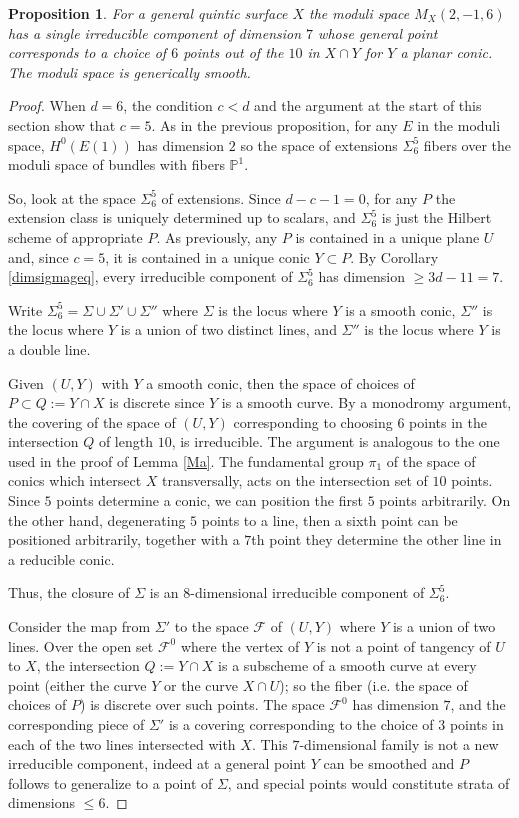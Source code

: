 \documentclass{amsart}
\theoremstyle{plain}
\newtheorem{proposition}[theorem]{Proposition}
\numberwithin{equation}{section}
\begin{document}
\begin{proposition}
For a general quintic surface $X$ the moduli space $M_X(2,-1,6)$ has
a single irreducible component of dimension $7$ whose general point
corresponds to a choice of $6$ points out of the $10$
in $X\cap Y$ for $Y$ a planar conic. The moduli space is generically smooth. 
\end{proposition}
\begin{proof}
When $d=6$,
the condition $c<d$ and the argument at the start of this section show that $c=5$.
As in the previous proposition, for any $E$ in the moduli space,
$H^0(E(1))$ has dimension $2$ so the space of extensions $\Sigma ^5_6$
fibers over the moduli space of bundles with fibers ${{\mathbb P}} ^1$.

So, look at the space $\Sigma ^5_6$ of extensions.
Since $d-c-1=0$, for any $P$ the extension class is uniquely determined up to scalars,
and $\Sigma ^5_6$ is just the Hilbert scheme of appropriate $P$. As previously,
any $P$ is contained in a unique plane $U$ and, since $c=5$, it is contained in a unique
conic $Y\subset P$. By Corollary \ref{dimsigmageq}, 
every irreducible component of $\Sigma ^5_6$
has dimension $\geq 3d-11 = 7$. 

Write $\Sigma ^5_6=\Sigma \cup \Sigma ' \cup \Sigma ''$ where 
$\Sigma$ is the locus where $Y$ is a smooth conic, $\Sigma ''$ is the locus where
$Y$ is a union of two distinct lines, and $\Sigma ''$ is the locus where $Y$ is
a double line. 

Given $(U,Y)$ with $Y$ a smooth conic, then the space of choices of $P\subset Q:=Y\cap X$
is discrete since $Y$ is a smooth curve. By a monodromy argument, the
covering of the space of $(U,Y)$ corresponding to choosing $6$ points 
in the intersection $Q$ of length $10$, is irreducible. 
The argument is analogous to the one used in the proof of Lemma \ref{Ma}.
The fundamental group $\pi _1$ of the space of conics which intersect $X$ transversally,
acts on the intersection set of $10$ points. Since $5$ points determine a conic, we can
position the first $5$ points arbitrarily. On the other hand, degenerating $5$ points to
a line, then a sixth  point can be positioned arbitrarily, together with a $7$th point
they determine the other line in a reducible conic. 

Thus,
the closure of $\Sigma$ is an $8$-dimensional
irreducible component of $\Sigma ^5_6$. 

Consider the map from $\Sigma '$ to the space ${{\mathcal F}}$
of $(U,Y)$ where $Y$ is a union of two lines.
Over the open set ${{\mathcal F}} ^0$ where the vertex of $Y$ is not a point of tangency of $U$ to $X$,
the intersection $Q:=Y\cap X$ is a subscheme of a smooth curve at every point
(either the curve $Y$ or the curve $X\cap U$); so
the fiber (i.e. the space of choices of $P$) is discrete over such points. 
The space ${{\mathcal F}} ^0$ has dimension $7$, and the corresponding piece of $\Sigma '$ is a
covering corresponding to the choice of $3$ points in each of the two
lines intersected with $X$. This $7$-dimensional family is not a new irreducible
component, indeed at a general point $Y$ can be smoothed and $P$ follows to 
generalize to a point of $\Sigma$, and special points would constitute strata of
dimensions $\leq 6$. 


\end{proof}
\end{document}
